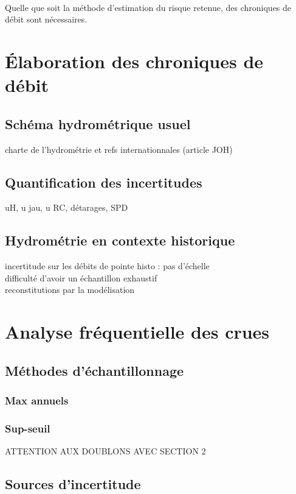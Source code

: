 \documentclass[11pt]{article}
\begin{document}
	    \paragraph{} Quelle que soit la méthode d'estimation du risque retenue, des chroniques de débit sont nécessaires.
	    
\section{Élaboration des chroniques de débit}
		\subsection{Schéma hydrométrique usuel}
		charte de l'hydrométrie et refs internationnales (article JOH)
		\subsection{Quantification des incertitudes}
		uH, u jau, u RC, détarages, SPD
		
		\subsection{Hydrométrie en contexte historique}
		incertitude sur les débits de pointe histo : pas d'échelle\\
		difficulté d'avoir un échantillon exhaustif\\
		reconstitutions par la modélisation\\
	
		
\section{Analyse fréquentielle des crues}
		\subsection{Méthodes d'échantillonnage}
			\subsubsection{Max annuels}
			\subsubsection{Sup-seuil}
			
			ATTENTION AUX DOUBLONS AVEC SECTION 2
		\subsection{Sources d'incertitude}
\end{document}
